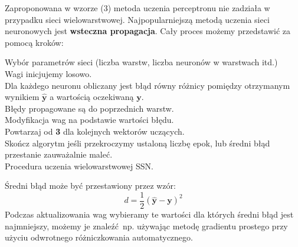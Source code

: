 \documentclass{article}
\renewcommand{\vec}[1]{\mathbf{#1}}
\begin{document}
Zaproponowana w wzorze (3) metoda uczenia perceptronu nie zadziała w przypadku sieci
wielowarstwowej. Najpopularniejszą metodą uczenia sieci neuronowych 
jest \textbf{wsteczna propagacja}. Cały proces możemy przedstawić za pomocą kroków:

{\LinesNumbered
\begin{algorithm}[H]
 Wybór parametrów sieci (liczba warstw, liczba neuronów w warstwach itd.)\\
 Wagi inicjujemy losowo.\\
 Dla każdego neuronu obliczany jest błąd równy różnicy pomiędzy otrzymanym
 wynikiem $\hat{\vec{y}}$ a wartością oczekiwaną $\vec{y}$.\\
 Błędy propagowane są do poprzednich warstw.\\
 Modyfikacja wag na podstawie wartości błędu.\\
 Powtarzaj od \textbf{3} dla kolejnych wektorów uczących.\\
 Skończ algorytm jeśli przekroczymy ustaloną liczbę epok, lub średni błąd przestanie zauważalnie
 maleć.\\
 \caption{Procedura uczenia wielowarstwowej SSN.}
\end{algorithm}}
Średni błąd może być przestawiony przez wzór:
\begin{equation}
	d = \frac{1}{2}(\hat{\vec{y}} - \vec{y})^2
\end{equation}
Podczas aktualizowania wag wybieramy te wartości dla których średni błąd jest najmniejszy, możemy
je znaleźć np. używając metodę gradientu prostego przy użyciu odwrotnego różniczkowania
automatycznego.
\end{document}
